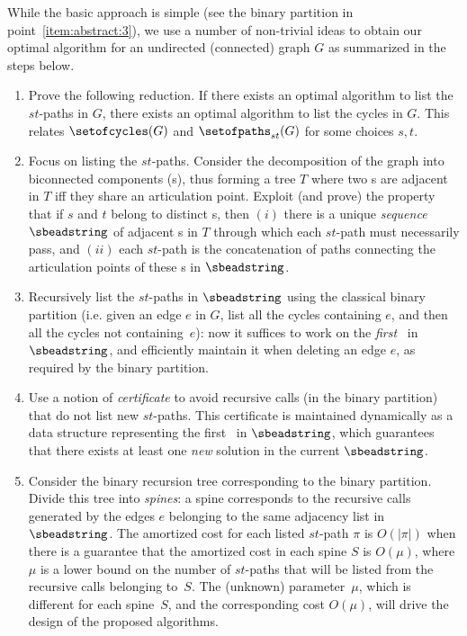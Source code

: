 While the basic approach is simple (see the binary partition in
  point~\ref{item:abstract:3}), we use a number of non-trivial ideas to
  obtain our optimal algorithm for an undirected (connected) graph $G$
  as summarized in the steps below.
  \begin{enumerate}
  \item Prove the following reduction. If there exists an optimal
    algorithm to list the $st$-paths in $G$, there exists an optimal
    algorithm to list the cycles in $G$. This relates
    $\setofcycles(G)$ and $\setofpaths_{st}(G)$ for some choices $s,t$.



  \item Focus on listing the $st$-paths. Consider the decomposition of
    the graph into biconnected components ({\bcc}s), thus forming a
    tree $T$ where two {\bcc}s are adjacent in $T$ iff they share an
    articulation point. Exploit (and prove) the property that if $s$
    and $t$ belong to distinct {\bcc}s, then $(i)$ there is a unique
    \emph{sequence} $\sbeadstring$ of adjacent {\bcc}s in $T$ through
    which each $st$-path must necessarily pass, and $(ii)$ each
    $st$-path is the concatenation of paths connecting the
    articulation points of these {\bcc}s in $\sbeadstring$.

  \item \label{item:abstract:3} Recursively list the $st$-paths in
    $\sbeadstring$ using the classical binary partition (i.e.\mbox{}
    given an edge $e$ in $G$, list all the cycles containing
    $e$, and then all the cycles not containing~$e$): now it suffices to
    work on the \emph{first} \bcc\ in $\sbeadstring$, and efficiently
    maintain it when deleting an edge $e$, as required by the binary
    partition.

  \item Use a notion of \emph{certificate} to avoid recursive calls
    (in the binary partition) that do not list new $st$-paths.  This
    certificate is maintained dynamically as a data structure
    representing the first \bcc\ in $\sbeadstring$, which guarantees
    that there exists at least one \emph{new} solution in the current
    $\sbeadstring$.

  \item Consider the binary recursion tree corresponding to the binary
    partition.  Divide this tree into \emph{spines}: a spine
    corresponds to the recursive calls generated by the edges $e$
    belonging to the same adjacency list in $\sbeadstring$.  The
    amortized cost for each listed $st$-path $\pi$ is $O(|\pi|)$ when
    there is a guarantee that the amortized cost in each spine $S$ is
    $O(\mu)$, where $\mu$ is a lower bound on the number of $st$-paths
    that will be listed from the recursive calls belonging to~$S$. The
    (unknown) parameter~$\mu$, which is different for each spine~$S$, and the
    corresponding cost $O(\mu)$, will drive the design of the proposed
    algorithms.
  \end{enumerate}

